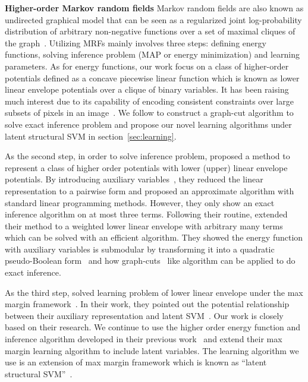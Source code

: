 \documentclass[sigconf,anonymous,review]{acmart}
\renewcommand{\citename}{\citet}
\renewcommand{\cite}{\citep}
\begin{document}
\textbf{Higher-order Markov random fields} Markov random
  fields are also known as undirected graphical model
that can be seen as a regularized joint log-probability
distribution of arbitrary non-negative functions over a set of
maximal cliques of the graph~\cite{bishop:2006:PRML}. Utilizing
MRFs mainly involves three steps: defining energy
  functions, solving inference problem (MAP or energy
minimization) and learning parameters. As for energy
  functions, our work focus on a class of higher-order
potentials defined as a concave piecewise linear function which
is known as lower linear envelope potentials over a clique
of binary variables. It has been raising much interest due to its
capability of encoding consistent constraints over large subsets
of pixels in an image~\cite{Kohli:CVPR07,Nowozin:2011}. We follow
\citename{gouldlearning} to construct a graph-cut algorithm to
solve exact inference problem and propose our novel learning
algorithms under latent structural SVM in
section~\ref{sec:learning}.

As the second step, in order to solve inference problem,
\citename{kohli2009robust} proposed a method to represent a class
of higher order potentials with lower (upper) linear envelope
potentials. By introducing auxiliary
variables~\cite{Kohli:CVPR10}, they reduced the linear
representation to a pairwise form and proposed an approximate
algorithm with standard linear programming methods. However, they
only show an exact inference algorithm on at most three terms.
Following their routine, \citename{gouldlearning} extended their
method to a weighted lower linear envelope with arbitrary many
terms which can be solved with an efficient algorithm. They
showed the energy function with auxiliary variables is submodular
by transforming it into a quadratic pseudo-Boolean
form~\cite{Boros:MATH02} and how
graph-cuts~\cite{Hammer:1965, Boykov:ICCV01,
  Freedman:CVPR05} like algorithm can be applied to do exact
inference.

As the third step, \citename{gouldlearning} solved
learning problem of lower linear envelope under the max
margin framework~\cite{tsochantaridis2005large}. In their work, 
they pointed out the potential relationship between their
auxiliary representation and latent SVM~\cite{yu2009learning}.
Our work is closely based on their research. We continue to use
the higher order energy function and inference algorithm
developed in their previous work~\cite{Gould:ICML2011} and extend
their max margin learning algorithm to include latent variables.
The learning algorithm we use is an extension of max margin
framework which is known as ``latent structural
SVM''~\cite{yu2009learning}.
\end{document}

